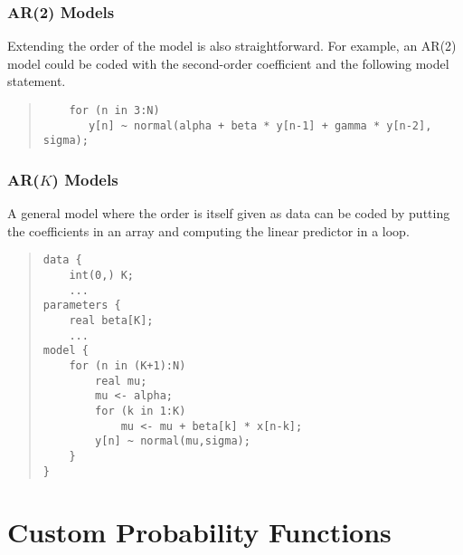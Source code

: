 \subsection{AR(2) Models}

Extending the order of the model is also straightforward.  For
example, an AR(2) model could be coded with the second-order
coefficient  and the following model statement.
%
\begin{quote}
\begin{Verbatim}
    for (n in 3:N)
       y[n] ~ normal(alpha + beta * y[n-1] + gamma * y[n-2], sigma);
\end{Verbatim}
\end{quote}


\subsection{AR($K$) Models}

A general model where the order is itself given as data can be coded
by putting the coefficients in an array and computing the linear
predictor in a loop.
%
\begin{quote}
\begin{Verbatim}
data {
    int(0,) K;
    ...
parameters {
    real beta[K];
    ...
model {
    for (n in (K+1):N)
        real mu;
        mu <- alpha;
        for (k in 1:K)
            mu <- mu + beta[k] * x[n-k];
        y[n] ~ normal(mu,sigma);
    }
}
\end{Verbatim}
\end{quote}





\chapter{Custom Probability  Functions}%
\label{custom-probability-functions.chapter}


